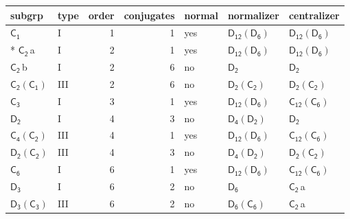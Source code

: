 \documentclass[10pt,a4paper]{article}
\numberwithin{equation}{section}
\newcommand{\grp}[1]{\mathsf{#1}}
\newcommand{\clsletter}[1]{\,{\scriptsize\color{black!55}#1}}
\begin{document}
{\small\begin{longtable}{@{}llrrlll@{}}\toprule
subgrp & type & order & conjugates & normal & normalizer & centralizer\\\midrule\endhead
\bottomrule\endfoot\endlastfoot
\href{../../../rotation/data/pdf/C1.pdf}{$\grp{C_{1}}$} & I & 1 & 1 & yes & \href{D12-D6.pdf}{$\grp{D_{12}}(\grp{D_{6}})$} & \href{D12-D6.pdf}{$\grp{D_{12}}(\grp{D_{6}})$}\\*
\href{../../../rotation/data/pdf/C2.pdf}{$\grp{C_{2}}$}\clsletter{a} & I & 2 & 1 & yes & \href{D12-D6.pdf}{$\grp{D_{12}}(\grp{D_{6}})$} & \href{D12-D6.pdf}{$\grp{D_{12}}(\grp{D_{6}})$}\\
\href{../../../rotation/data/pdf/C2.pdf}{$\grp{C_{2}}$}\clsletter{b} & I & 2 & 6 & no & \href{../../../rotation/data/pdf/D2.pdf}{$\grp{D_{2}}$} & \href{../../../rotation/data/pdf/D2.pdf}{$\grp{D_{2}}$}\\
\href{C2-C1.pdf}{$\grp{C_{2}}(\grp{C_{1}})$} & III & 2 & 6 & no & \href{D2-C2.pdf}{$\grp{D_{2}}(\grp{C_{2}})$} & \href{D2-C2.pdf}{$\grp{D_{2}}(\grp{C_{2}})$}\\
\href{../../../rotation/data/pdf/C3.pdf}{$\grp{C_{3}}$} & I & 3 & 1 & yes & \href{D12-D6.pdf}{$\grp{D_{12}}(\grp{D_{6}})$} & \href{C12-C6.pdf}{$\grp{C_{12}}(\grp{C_{6}})$}\\
\href{../../../rotation/data/pdf/D2.pdf}{$\grp{D_{2}}$} & I & 4 & 3 & no & \href{D4-D2.pdf}{$\grp{D_{4}}(\grp{D_{2}})$} & \href{../../../rotation/data/pdf/D2.pdf}{$\grp{D_{2}}$}\\
\href{C4-C2.pdf}{$\grp{C_{4}}(\grp{C_{2}})$} & III & 4 & 1 & yes & \href{D12-D6.pdf}{$\grp{D_{12}}(\grp{D_{6}})$} & \href{C12-C6.pdf}{$\grp{C_{12}}(\grp{C_{6}})$}\\
\href{D2-C2.pdf}{$\grp{D_{2}}(\grp{C_{2}})$} & III & 4 & 3 & no & \href{D4-D2.pdf}{$\grp{D_{4}}(\grp{D_{2}})$} & \href{D2-C2.pdf}{$\grp{D_{2}}(\grp{C_{2}})$}\\
\href{../../../rotation/data/pdf/C6.pdf}{$\grp{C_{6}}$} & I & 6 & 1 & yes & \href{D12-D6.pdf}{$\grp{D_{12}}(\grp{D_{6}})$} & \href{C12-C6.pdf}{$\grp{C_{12}}(\grp{C_{6}})$}\\
\href{../../../rotation/data/pdf/D3.pdf}{$\grp{D_{3}}$} & I & 6 & 2 & no & \href{../../../rotation/data/pdf/D6.pdf}{$\grp{D_{6}}$} & \href{../../../rotation/data/pdf/C2.pdf}{$\grp{C_{2}}$}\clsletter{a}\\
\href{D3-C3.pdf}{$\grp{D_{3}}(\grp{C_{3}})$} & III & 6 & 2 & no & \href{D6-C6.pdf}{$\grp{D_{6}}(\grp{C_{6}})$} & \href{../../../rotation/data/pdf/C2.pdf}{$\grp{C_{2}}$}\clsletter{a}\\

\end{longtable}}
\end{document}
